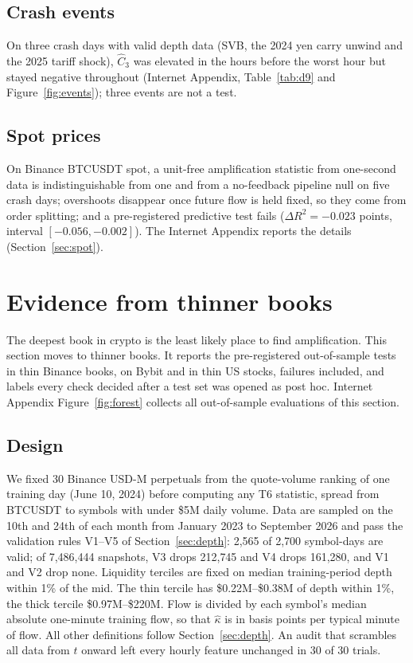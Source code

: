 \documentclass[12pt]{article}
\theoremstyle{definition}
\theoremstyle{remark}
\begin{document}
\subsection{Crash events}
On three crash days with valid depth data (SVB, the 2024 yen carry unwind and the 2025 tariff shock), $\hat C_3$ was elevated in the hours before the worst hour but stayed negative throughout (Internet Appendix, Table~\ref{tab:d9} and Figure~\ref{fig:events}); three events are not a test.

\subsection{Spot prices}
On Binance BTCUSDT spot, a unit-free amplification statistic from one-second data is indistinguishable from one and from a no-feedback pipeline null on five crash days; overshoots disappear once future flow is held fixed, so they come from order splitting; and a pre-registered predictive test fails ($\Delta R^2=-0.023$ points, interval $[-0.056,-0.002]$). The Internet Appendix reports the details (Section~\ref{sec:spot}).

\section{Evidence from thinner books}\label{sec:thin}

The deepest book in crypto is the least likely place to find amplification. This section moves to thinner books. It reports the pre-registered out-of-sample tests in thin Binance books, on Bybit and in thin US stocks, failures included, and labels every check decided after a test set was opened as post hoc. Internet Appendix Figure~\ref{fig:forest} collects all out-of-sample evaluations of this section.

\subsection{Design}\label{sec:thin_design}
We fixed 30 Binance USD-M perpetuals from the quote-volume ranking of one training day (June 10, 2024) before computing any T6 statistic, spread from BTCUSDT to symbols with under \$5M daily volume. Data are sampled on the 10th and 24th of each month from January 2023 to September 2026 and pass the validation rules V1--V5 of Section~\ref{sec:depth}: 2{,}565 of 2{,}700 symbol-days are valid; of 7{,}486{,}444 snapshots, V3 drops 212{,}745 and V4 drops 161{,}280, and V1 and V2 drop none. Liquidity terciles are fixed on median training-period depth within 1\% of the mid. The thin tercile has \$0.22M--\$0.38M of depth within 1\%, the thick tercile \$0.97M--\$220M. Flow is divided by each symbol's median absolute one-minute training flow, so that $\hat\kappa$ is in basis points per typical minute of flow. All other definitions follow Section~\ref{sec:depth}. An audit that scrambles all data from $t$ onward left every hourly feature unchanged in 30 of 30 trials.
\end{document}

